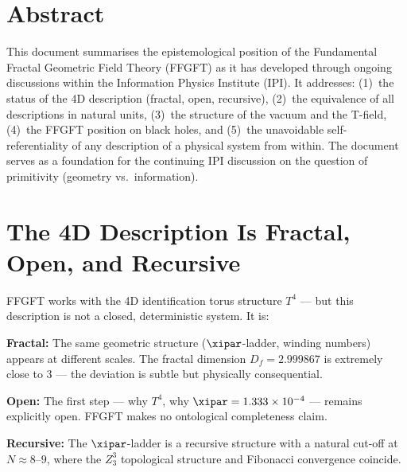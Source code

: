 
\section*{Abstract}

This document summarises the epistemological position of the Fundamental Fractal Geometric Field Theory (FFGFT) as it has developed through ongoing discussions within the Information Physics Institute (IPI). It addresses: (1)~the status of the 4D description (fractal, open, recursive), (2)~the equivalence of all descriptions in natural units, (3)~the structure of the vacuum and the T-field, (4)~the FFGFT position on black holes, and (5)~the unavoidable self-referentiality of any description of a physical system from within. The document serves as a foundation for the continuing IPI discussion on the question of primitivity (geometry vs.\ information).

\tableofcontents
\newpage

\section{The 4D Description Is Fractal, Open, and Recursive}

FFGFT works with the 4D identification torus structure $T^4$ --- but this description is not a closed, deterministic system. It is:

\textbf{Fractal:} The same geometric structure ($\xipar$-ladder, winding numbers) appears at different scales. The fractal dimension $D_f = 2.999867$ is extremely close to 3 --- the deviation is subtle but physically consequential.

\textbf{Open:} The first step --- why $T^4$, why $\xipar = 1.333 \times 10^{-4}$ --- remains explicitly open. FFGFT makes no ontological completeness claim.

\textbf{Recursive:} The $\xipar$-ladder is a recursive structure with a natural cut-off at $N \approx 8$--$9$, where the $Z_3^3$ topological structure and Fibonacci convergence coincide.

